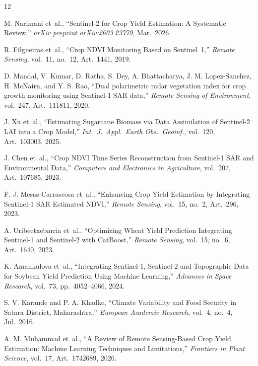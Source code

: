 \documentclass[conference]{IEEEtran}
\begin{document}
\begin{thebibliography}{12}

M. Narimani et~al., ``Sentinel-2 for Crop Yield Estimation: A Systematic
Review,'' \textit{arXiv preprint arXiv:2603.23779}, Mar.\ 2026.

R. Filgueiras et~al., ``Crop NDVI Monitoring Based on Sentinel~1,''
\textit{Remote Sensing}, vol.~11, no.~12, Art.\ 1441, 2019.

D. Mandal, V. Kumar, D. Ratha, S. Dey, A. Bhattacharya, J. M.
Lopez-Sanchez, H. McNairn, and Y. S. Rao, ``Dual polarimetric radar
vegetation index for crop growth monitoring using Sentinel-1 SAR data,''
\textit{Remote Sensing of Environment}, vol.~247, Art.\ 111811, 2020.

J. Xu et~al., ``Estimating Sugarcane Biomass via Data Assimilation of
Sentinel-2 LAI into a Crop Model,'' \textit{Int.\ J.\ Appl.\ Earth Obs.\
Geoinf.}, vol.~120, Art.\ 103003, 2025.

J. Chen et~al., ``Crop NDVI Time Series Reconstruction from Sentinel-1 SAR
and Environmental Data,'' \textit{Computers and Electronics in Agriculture},
vol.~207, Art.\ 107685, 2023.

F. J. Mesas-Carrascosa et~al., ``Enhancing Crop Yield Estimation by
Integrating Sentinel-1 SAR Estimated NDVI,'' \textit{Remote Sensing},
vol.~15, no.~2, Art.\ 296, 2023.

A. Uribeetxebarria et~al., ``Optimizing Wheat Yield Prediction Integrating
Sentinel-1 and Sentinel-2 with CatBoost,'' \textit{Remote Sensing}, vol.~15,
no.~6, Art.\ 1640, 2023.

K. Amankulova et~al., ``Integrating Sentinel-1, Sentinel-2 and Topographic
Data for Soybean Yield Prediction Using Machine Learning,'' \textit{Advances
in Space Research}, vol.~73, pp.~4052--4066, 2024.

S. V. Karande and P. A. Khadke, ``Climate Variability and Food Security in
Satara District, Maharashtra,'' \textit{European Academic Research}, vol.~4,
no.~4, Jul.\ 2016.

A. M. Muhammad et~al., ``A Review of Remote Sensing-Based Crop Yield
Estimation: Machine Learning Techniques and Limitations,'' \textit{Frontiers
in Plant Science}, vol.~17, Art.\ 1742689, 2026.


\end{thebibliography}
\end{document}
